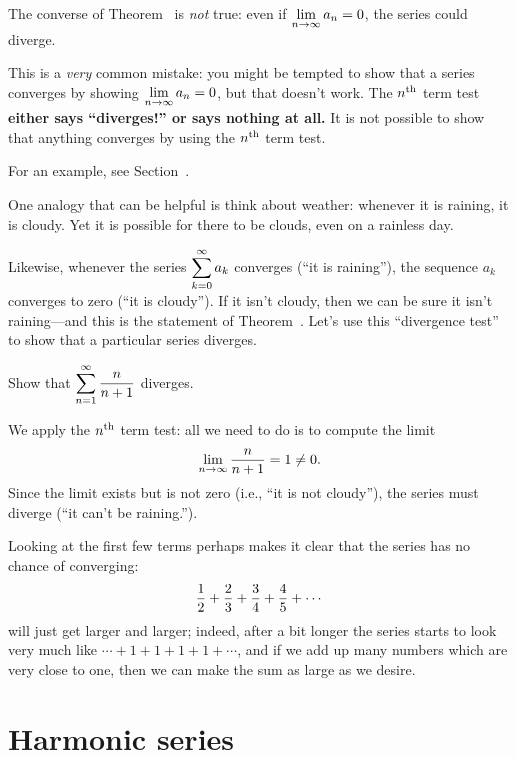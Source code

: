 \begin{warning}
  The converse of Theorem~ is {\em not\/}
  true: even if $\displaystyle\lim_{n\to\infty}a_n=0$, the series could diverge.

  This is a \textit{very} common mistake: you might be tempted
  to show that a series converges by showing
  $\displaystyle\lim_{n\to\infty}a_n=0$, but that doesn't work.  The $n^{\mbox{\scriptsize th}}$
  term test \textbf{either says ``diverges!'' or says nothing at all.}
  It is not possible to show that anything converges by using the
  $n^{\mbox{\scriptsize th}}$ term test.

  For an example, see Section~.
\end{warning}

One analogy that can be helpful is think
about weather: whenever it is raining, it is cloudy.  Yet it is
possible for there to be clouds, even on a rainless day.  

Likewise, whenever the series $\displaystyle\sum_{k=0}^\infty a_k$ converges
(``it is raining''), the sequence $a_k$ converges to zero (``it is
cloudy'').  If it isn't cloudy, then we can be sure it isn't
raining---and this is the statement of
Theorem~.  Let's use this ``divergence test''
to show that a particular series diverges.
\begin{example}
Show that $\displaystyle\sum_{n=1}^\infty \frac{n}{n+1}$ diverges.
\end{example}

\begin{solution}
We apply the $n^{\mbox{\scriptsize th}}$ term test: all we need to do is to compute the limit
$$\lim _{n\to\infty}{n\over n+1}=1\not=0.$$
Since the limit exists but is not zero (i.e., ``it is not cloudy''),
the series must diverge (``it can't be raining.'').

Looking at the first few terms perhaps makes it clear that the series
has no chance of converging:
$${1\over2}+{2\over3}+{3\over4}+{4\over5}+\cdots$$
will just get larger and larger; indeed, after a bit longer the series
starts to look very much like $\cdots+1+1+1+1+\cdots$, and if we add
up many numbers which are very close to one, then we can make the sum
as large as we desire.
\end{solution}

\section{Harmonic series}
\label{section:harmonic-series}

